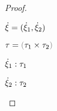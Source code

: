 \begin{proof}
\begin{byCases}
\begin{byCases}
\begin{byCases}
\begin{byCases}
\begin{byCases}
\begin{pfsteps*}
              \end{pfsteps*}
            \end{byCases}
          \end{byCases}
        \end{byCases}
      \end{byCases}
    \item[\text{(\ref{rule:CTPair})}]
    \begin{pfsteps*}
    \item $\dot{\xi}=(\dot{\xi}_1 , \dot{\xi}_2)$ 
    \item $\tau=\tprod{\tau_1}{\tau_2}$ 
    \item $\dot{\xi}_1 : \tau_1$  
    \item $\dot{\xi}_2 : \tau_2$  
    \end{pfsteps*} 


\end{byCases}
\end{proof}
